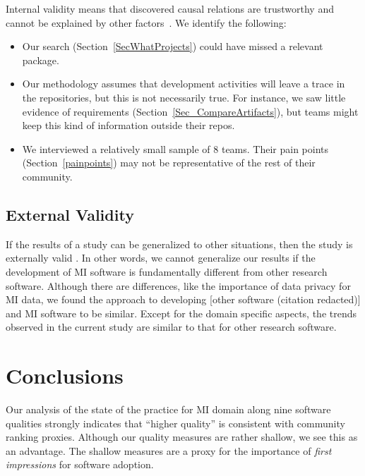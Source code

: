 \documentclass[doubleblind,12pt, 3p, times]{elsarticle}
\begin{document}
Internal validity means that discovered causal relations are trustworthy and
cannot be explained by other factors~\cite{RunesonAndHost2009}. We identify
the following:

\begin{itemize}
\item Our search (Section~\ref{SecWhatProjects}) could have missed a relevant
package.
\item Our methodology assumes that development activities
will leave a trace in the repositories, but this is not necessarily true. For
instance, we saw little evidence of requirements
(Section~\ref{Sec_CompareArtifacts}), but teams might keep this kind of
information outside their repos.
\item We interviewed a relatively small sample of 8 teams. Their pain points
(Section~\ref{painpoints}) may not be representative of the rest of their
community.
\end{itemize}

\subsection{External Validity}

If the results of a study can be generalized to other situations, then the
study is externally valid \cite{RunesonAndHost2009}.  In other words, we cannot
generalize our results if the development of MI software is fundamentally
different from other research software.  Although there are differences, like
the importance of data privacy for MI data, we found the approach to developing
[other software (citation redacted)]
and MI software to be similar.  Except for
the domain specific aspects, the trends observed in the current study are
similar to that for other research software.

\section{Conclusions} \label{ch_conclusions}

Our analysis of the state of the practice for MI domain along nine software
qualities strongly indicates that ``higher quality'' is consistent with
community ranking proxies. Although our quality measures are rather shallow, we
see this as an advantage. The shallow measures are a proxy for the importance of
\emph{first impressions} for software adoption.
\end{document}
